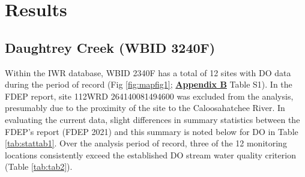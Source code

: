 \documentclass[]{interact}
\theoremstyle{plain}%
\theoremstyle{definition}
\theoremstyle{remark}
\begin{document}
\hypertarget{results}{%
\section{Results}\label{results}}

\hypertarget{daughtrey-creek-wbid-3240f}{%
\subsection{Daughtrey Creek (WBID
3240F)}\label{daughtrey-creek-wbid-3240f}}

Within the IWR database, WBID 2340F has a total of 12 sites with DO data
during the period of record (Fig \ref{fig:mapfig1};
\textbf{\protect\hyperlink{appendix-b}{Appendix B}} Table S1). In the
FDEP report, site 112WRD 264140081494600 was excluded from the analysis,
presumably due to the proximity of the site to the Caloosahatchee River.
In evaluating the current data, slight differences in summary statistics
between the FDEP's report (FDEP 2021) and this summary is noted below
for DO in Table \ref{tab:stattab1}. Over the analysis period of record,
three of the 12 monitoring locations consistently exceed the established
DO stream water quality criterion (Table \ref{tab:tab2}).

\begin{table}[H]

\caption{\label{tab:table1}\label{tab:stattab1} Summary statisic of dissolved oxygen (DO) saturation for Daughtrey Creek (WBID 3240F) during the period of record (Calendar Year: 2006 - 2020) as reported by FDEP (2021) and summaried data (this report)}
\centering
{}
\end{table}
\end{document}
